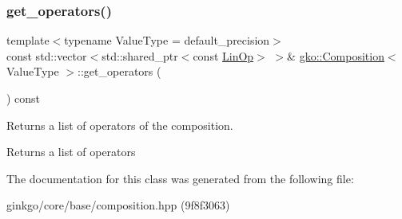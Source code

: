 \subsubsection{\texorpdfstring{get\+\_\+operators()}{get\_operators()}}
{\footnotesize\ttfamily template$<$typename Value\+Type  = default\+\_\+precision$>$ \\
const std\+::vector$<$std\+::shared\+\_\+ptr$<$const \hyperlink{classgko_1_1LinOp}{Lin\+Op}$>$ $>$\& \hyperlink{classgko_1_1Composition}{gko\+::\+Composition}$<$ Value\+Type $>$\+::get\+\_\+operators (\begin{DoxyParamCaption}{ }\end{DoxyParamCaption}) const\hspace{0.3cm}{\ttfamily [noexcept]}}



Returns a list of operators of the composition. 

\begin{DoxyReturn}{Returns}
a list of operators 
\end{DoxyReturn}


The documentation for this class was generated from the following file\+:\begin{DoxyCompactItemize}
\item 
ginkgo/core/base/composition.\+hpp (9f8f3063)\end{DoxyCompactItemize}

